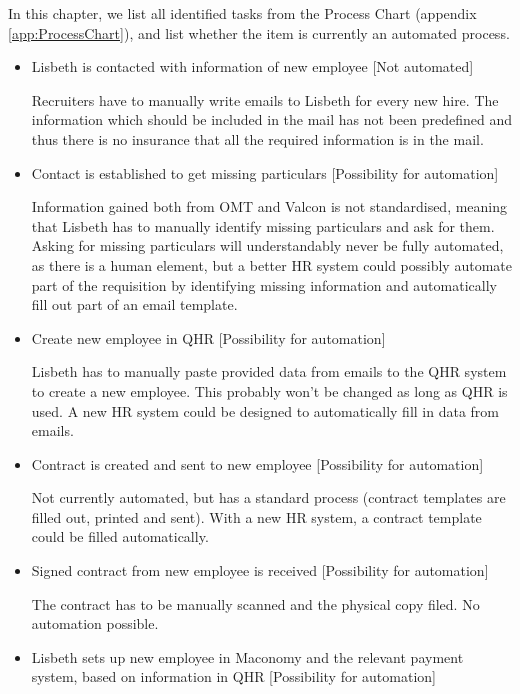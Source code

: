 \label{app:automatise}
In this chapter, we list all identified tasks from the Process Chart (appendix \ref*{app:ProcessChart}), and list whether the item is currently an automated process. 

\begin{itemize}
	\item{Lisbeth is contacted with information of new employee} [Not automated]
	
		Recruiters have to manually write emails to Lisbeth for every new hire. The information which should be included in the mail has not been predefined and thus there is no insurance that all the required information is in the mail.
		
	\item{Contact is established to get missing particulars} [Possibility for automation]
	
		Information gained both from OMT and Valcon is not standardised, meaning that Lisbeth has to manually identify missing particulars and ask for them. Asking for missing particulars will understandably never be fully automated, as there is a human element, but a better HR system could possibly automate part of the requisition by identifying missing information and automatically fill out part of an email template.
		
	\item{Create new employee in QHR} [Possibility for automation]
	
		Lisbeth has to manually paste provided data from emails to the QHR system to create a new employee. This probably won't be changed as long as QHR is used. A new HR system could be designed to automatically fill in data from emails.
	
	\item{Contract is created and sent to new employee} [Possibility for automation]
	
		Not currently automated, but has a standard process (contract templates are filled out, printed and sent).
		With a new HR system, a contract template could be filled automatically.
	
	\item{Signed contract from new employee is received} [Possibility for automation]
	
		The contract has to be manually scanned and the physical copy filed. No automation possible.
	
	\item{Lisbeth sets up new employee in Maconomy and the relevant payment system, based on information in QHR} [Possibility for automation]
	

\end{itemize}
